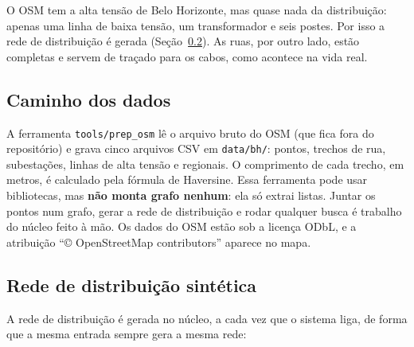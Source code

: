 \documentclass[12pt]{article}
\begin{document}
O OSM tem a alta tensão de Belo Horizonte, mas quase nada da distribuição: apenas uma linha de baixa tensão, um transformador e seis postes. Por isso a rede de distribuição é gerada (Seção~\ref{sec:geracao}). As ruas, por outro lado, estão completas e servem de traçado para os cabos, como acontece na vida real.

\subsection{Caminho dos dados}

A ferramenta \texttt{tools/prep\_osm} lê o arquivo bruto do OSM (que fica fora do repositório) e grava cinco arquivos CSV em \texttt{data/bh/}: pontos, trechos de rua, subestações, linhas de alta tensão e regionais. O comprimento de cada trecho, em metros, é calculado pela fórmula de Haversine. Essa ferramenta pode usar bibliotecas, mas \textbf{não monta grafo nenhum}: ela só extrai listas. Juntar os pontos num grafo, gerar a rede de distribuição e rodar qualquer busca é trabalho do núcleo feito à mão. Os dados do OSM estão sob a licença ODbL, e a atribuição \textquotedblleft{}\copyright{} OpenStreetMap contributors\textquotedblright{} aparece no mapa.

\subsection{Rede de distribuição sintética}
\label{sec:geracao}

A rede de distribuição é gerada no núcleo, a cada vez que o sistema liga, de forma que a mesma entrada sempre gera a mesma rede:
\end{document}
